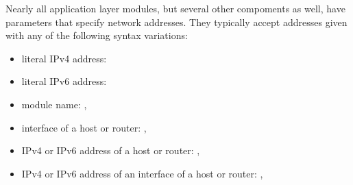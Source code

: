 Nearly all application layer modules, but several other compoments as well,
have parameters that specify network addresses. They typically accept
addresses given with any of the following syntax variations:

\begin{itemize}
  \item literal IPv4 address: 
  \item literal IPv6 address: 
  \item module name: , 
  \item interface of a host or router: , 
  \item IPv4 or IPv6 address of a host or router: ,
  \item IPv4 or IPv6 address of an interface of a host or router:
      , 
\end{itemize}





